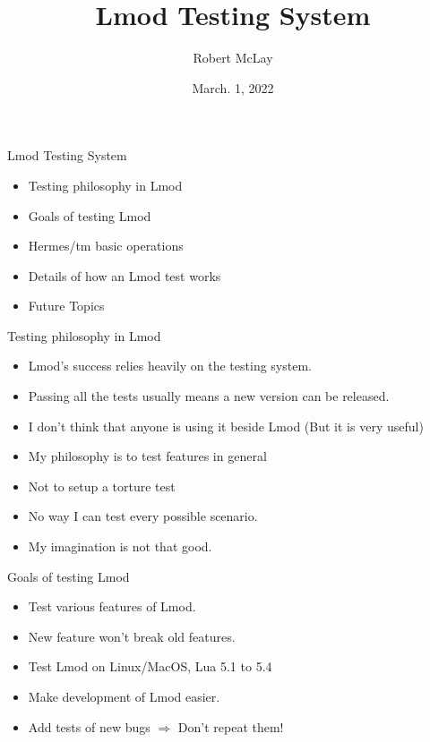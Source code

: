 \documentclass{beamer}
\begin{document}
\title[Lmod]{Lmod Testing System}
\author{Robert McLay} 
\date{March. 1, 2022}

\frame{\titlepage} 


\begin{frame}{Lmod Testing System}
  \begin{itemize}
    \item Testing philosophy in Lmod
    \item Goals of testing Lmod
    \item Hermes/tm basic operations
    \item Details of how an Lmod test works
    \item Future Topics
  \end{itemize}
\end{frame}

\begin{frame}{Testing philosophy in Lmod}
  \begin{itemize}
    \item Lmod's success relies heavily on the testing system.
    \item Passing all the tests usually means a new version can be released.
    \item I don't think that anyone is using it beside Lmod (But it is
      very useful)
    \item My philosophy is to test features in general
    \item Not to setup a torture test
    \item No way I can test every possible scenario.
    \item My imagination is not that good.
  \end{itemize}
\end{frame}


\begin{frame}{Goals of testing Lmod}
  \begin{itemize}
    \item Test various features of Lmod.
    \item New feature won't break old features.
    \item Test Lmod on Linux/MacOS, Lua 5.1 to 5.4
    \item Make development of Lmod easier.
    \item Add tests of new bugs $\Rightarrow$ Don't repeat them!
  \end{itemize}
\end{frame}
\end{document}
